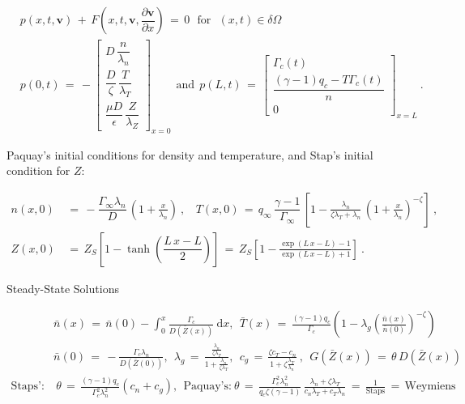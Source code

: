 \documentclass[a4paper,8pt]{article}
\begin{document}
\begin{align}
    &p\left(x, t, \mathbf{v}\right) \,+\, F\left(x, t, \mathbf{v}, \dfrac{\partial\mathbf{v}}{\partial x}\right) \,=\, 0 ~~~ \text{for} ~~~ (x, t) \in \delta\Omega \\
&p(0, t) \,=\, -\begin{bmatrix}
                D \, \dfrac{n}{\lambda_n}\\[2ex]
                \dfrac{D}{\zeta} \, \dfrac{T}{\lambda_T} \\[2ex]
                \dfrac{\mu D}{\epsilon} \, \dfrac{Z}{\lambda_Z}
                \end{bmatrix}_{x = 0}
~~ \text{and} ~~
p(L, t) \,=\, \begin{bmatrix}
                \Gamma_c(t) \\[1ex]
                \dfrac{(\gamma - 1) q_c - T\Gamma_c(t)}{n} \\[2ex]
                0
                \end{bmatrix}_{x=L}~.
\end{align}

\normalsize

Paquay's initial conditions for density and temperature, and Stap's
initial condition for \(Z\): \small

\begin{align}
    n(x,0) \,&=\, -\dfrac{\Gamma_\infty \lambda_n}{D} \, \left(1 + \frac{x}{\lambda_n}\right)~, ~~~~ T(x,0) \,=\, q_\infty \, \dfrac{\gamma - 1}{\Gamma_\infty} \, \left[1 - \frac{\lambda_n}{\zeta \lambda_T + \lambda_n} \, \left(1 + \frac{x}{\lambda_n}\right)^{-\zeta}\right]~, \\
    Z(x,0) \,&=\, Z_S\left[1 - \tanh\left(\dfrac{L\,x - L}{2}\right)\right] \,=\, Z_S\left[1 - \frac{\exp(L\,x - L) - 1}{\exp(L\,x - L) + 1}\right]~.
\end{align}

\normalsize

Steady-State Solutions \small

\begin{align}
    &\bar{n}(x) \,=\, \bar{n}(0) - \int_0^x \frac{\Gamma_c}{D(\bar{Z}(x))}~\text{d}x, ~~ \bar{T}(x) \,=\, \frac{(\gamma - 1) q_c}{\Gamma_c} \left(1 - \lambda_g\left(\frac{\bar{n}(x)}{\bar{n}(0)}\right)^{-\zeta}\right) \\
    &\bar{n}(0) \,=\, -\frac{\Gamma_c \lambda_n}{D(\bar{Z}(0))}, ~~ \lambda_g \,=\, \frac{\frac{\lambda_n}{\zeta \lambda_T}}{1 + \frac{\lambda_n}{\zeta \lambda_T}}, ~~ c_g \,=\, \frac{\zeta c_T - c_n}{1 + \zeta \frac{\lambda_T}{\lambda_n}}~, ~~ G(\bar{Z}(x)) \,=\, \theta\,D(\bar{Z}(x)) \\
    \text{Staps':}& ~ \theta \,=\, \frac{(\gamma - 1) q_c}{\Gamma_c^2 \lambda_n^2} (c_n + c_g), ~~ \text{Paquay's:} ~ \theta \,=\, \frac{\Gamma_c^2 \lambda_n^2}{q_c \zeta (\gamma - 1)} \, \frac{\lambda_n + \zeta\lambda_T}{c_n\lambda_T + c_T\lambda_n} \,=\, \frac{1}{\text{Staps}} \,=\, \text{Weymiens}
\end{align}
\end{document}
